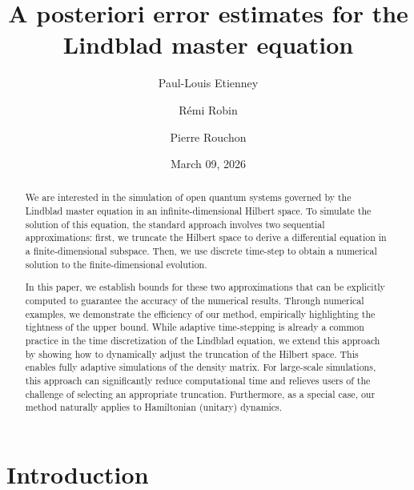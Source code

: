 \documentclass[a4paper,onecolumn,amsmath,amssymb,amsfonts,accepted=2026-03-06]{quantumarticle}
\title{A posteriori error estimates for the Lindblad master equation}
\author{Paul-Louis Etienney}
\author{Rémi Robin}
\author{Pierre Rouchon}
\affiliation{Laboratoire de Physique de l'\'Ecole Normale Supérieure, Mines Paris, Inria, CNRS, ENS-PSL, Sorbonne Universit\'{e}, PSL Research University, Paris, France}
\date{March 09, 2026}
\begin{document}
\maketitle

\begin{abstract}
We are interested in the simulation of open quantum systems governed by the Lindblad master equation in an infinite-dimensional Hilbert space. To simulate the solution of this equation, the standard approach involves two sequential approximations: first, we truncate the Hilbert space to derive a differential equation in a finite-dimensional subspace. Then, we use discrete time-step to obtain a numerical solution to the finite-dimensional evolution.

In this paper, we establish bounds for these two approximations that can be explicitly computed to guarantee the accuracy of the numerical results. Through numerical examples, we demonstrate the efficiency of our method, empirically highlighting the tightness of the upper bound. While adaptive time-stepping is already a common practice in the time discretization of the Lindblad equation, we extend this approach by showing how to dynamically adjust the truncation of the Hilbert space. This enables fully adaptive simulations of the density matrix. For large-scale simulations, this approach can significantly reduce computational time and relieves users of the challenge of selecting an appropriate truncation.
Furthermore, as a special case, our method naturally applies to Hamiltonian (unitary) dynamics.

\end{abstract}
\tableofcontents


\section{Introduction}
\label{subsec_lindblad}
\end{document}
